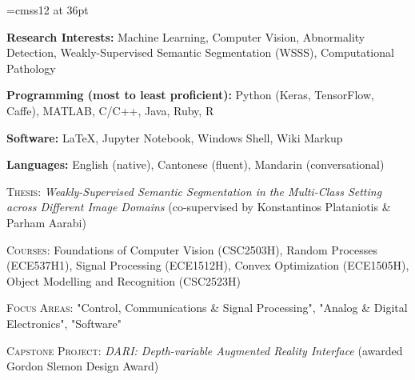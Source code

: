 \documentclass[11pt]{cv_style}
\begin{document}
\font\titlefont=cmss12 at 36pt


\begin{ditem}
	\item \textbf{Research Interests:} Machine Learning, Computer Vision, Abnormality Detection, Weakly-Supervised Semantic Segmentation (WSSS), Computational Pathology
	\item \textbf{Programming (most to least proficient):} Python (Keras, TensorFlow, Caffe), MATLAB, C/C++, Java, Ruby, R
	\item \textbf{Software:} \LaTeX, Jupyter Notebook, Windows Shell, Wiki Markup
	\item \textbf{Languages:} English (native), Cantonese (fluent), Mandarin (conversational)
\end{ditem}

\flushleft{}
\begin{ditem}
	\item \textsc{Thesis:} \textit{Weakly-Supervised Semantic Segmentation in the Multi-Class Setting across Different Image Domains} (co-supervised by Konstantinos Plataniotis \& Parham Aarabi)
	\item \textsc{Courses:} Foundations of Computer Vision (CSC2503H), Random Processes (ECE537H1), Signal Processing (ECE1512H), Convex Optimization (ECE1505H), Object Modelling and Recognition (CSC2523H)
\end{ditem}
\medspace
{}
\begin{ditem}
	\item \textsc{Focus Areas:} "Control, Communications \& Signal Processing", "Analog \& Digital Electronics", "Software"
	\item \textsc{Capstone Project:} \textit{DARI: Depth-variable Augmented Reality Interface} (awarded Gordon Slemon Design Award)
\end{ditem}
\end{document}
